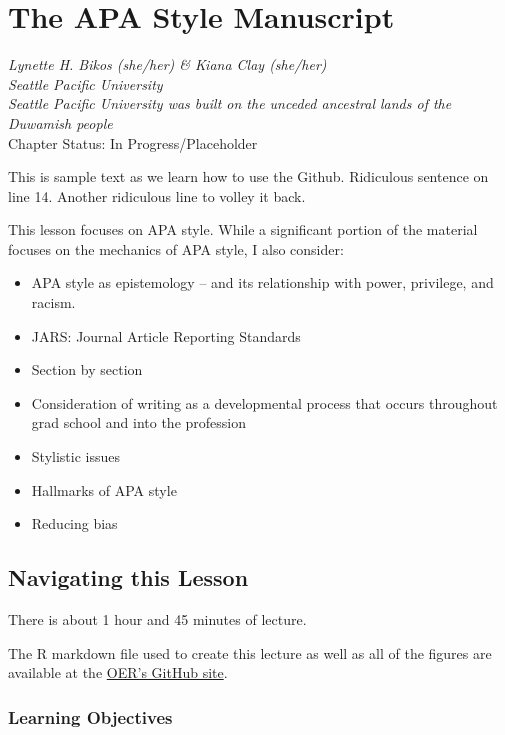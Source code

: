 \documentclass[
  11pt,
]{book}
\providecommand{\tightlist}{%
  \setlength{\itemsep}{0pt}\setlength{\parskip}{0pt}}
\begin{document}
\hypertarget{APAstyle}{%
\chapter{The APA Style Manuscript}\label{APAstyle}}

\emph{Lynette H. Bikos (she/her) \& Kiana Clay (she/her)}\\
\emph{Seattle Pacific University}\\
\emph{Seattle Pacific University was built on the unceded ancestral lands of the Duwamish people}\\
Chapter Status: In Progress/Placeholder

This is sample text as we learn how to use the Github.
Ridiculous sentence on line 14. Another ridiculous line to volley it back.

This lesson focuses on APA style. While a significant portion of the material focuses on the mechanics of APA style, I also consider:

\begin{itemize}
\tightlist
\item
  APA style as epistemology -- and its relationship with power, privilege, and racism.
\item
  JARS: Journal Article Reporting Standards
\item
  Section by section
\item
  Consideration of writing as a developmental process that occurs throughout grad school and into the profession
\item
  Stylistic issues
\item
  Hallmarks of APA style
\item
  Reducing bias
\end{itemize}

\hypertarget{navigating-this-lesson}{%
\section{Navigating this Lesson}\label{navigating-this-lesson}}

There is about 1 hour and 45 minutes of lecture.

The R markdown file used to create this lecture as well as all of the figures are available at the \href{https://github.com/lhbikos/ReC_Topics}{OER's GitHub site}.

\hypertarget{learning-objectives-2}{%
\subsection{Learning Objectives}\label{learning-objectives-2}}
\end{document}
